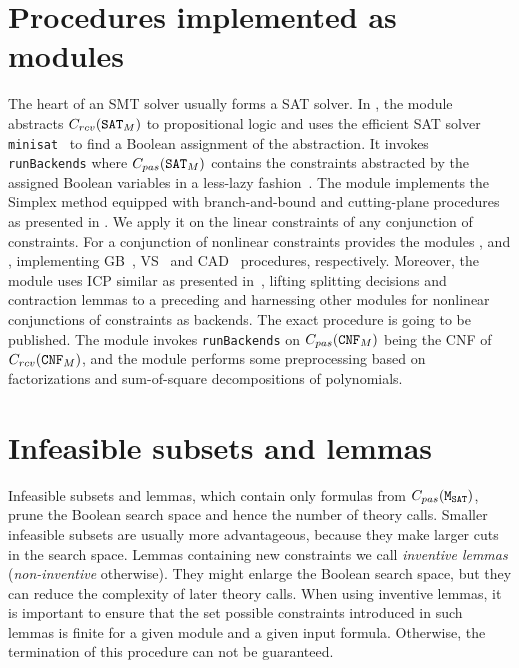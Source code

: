 \section{Procedures implemented as modules}
\label{sec:implemented_modules}
The heart of an SMT solver usually forms a SAT solver. In \smtrat, the module \satModule abstracts $C_{rcv}(\texttt{SAT$_M$})$ to propositional logic and uses the efficient SAT solver \texttt{minisat}~\cite{minisat} to find a Boolean assignment of the abstraction. It invokes \texttt{runBackends} where $C_{pas}(\texttt{SAT$_M$})$ contains the constraints abstracted by the assigned Boolean variables in a less-lazy fashion~\cite{sebastiani2007lazy}. The module \simplexModule implements the Simplex method equipped with branch-and-bound and cutting-plane procedures as presented in \cite{DM06}. We apply it on the linear constraints of any conjunction of \supportedLogics constraints. For a conjunction of nonlinear constraints \smtrat provides the modules \gbModule, \vsModule and \cadModule, implementing GB~\cite{JLCA_CAI13}, VS~\cite{Article_Corzilius_FCT2011} and CAD~\cite{Article_Loup_TubeCAD} procedures, respectively. Moreover, the module \icpModule uses ICP similar as presented in~\cite{GGIGSC10}, lifting splitting decisions and contraction lemmas to a preceding \satModule and harnessing other modules for nonlinear conjunctions of constraints as backends. The exact procedure is going to be published. The module \cnfModule invokes \texttt{runBackends} on $C_{pas}(\texttt{CNF$_M$})$ being the CNF of $C_{rcv}(\texttt{CNF$_M$})$, and the module \ppModule performs some preprocessing based on factorizations and sum-of-square decompositions of polynomials.

\section{Infeasible subsets and lemmas}
\label{sec::infsubset_lemmas}
Infeasible subsets and lemmas, which contain only formulas from 
$C_{pas}(\texttt{M$_\text{SAT}$})$, prune the Boolean search space and hence the number of theory calls. 
Smaller infeasible subsets are usually more advantageous, because they make larger cuts 
in the search space. Lemmas containing new constraints we call
\emph{inventive lemmas} (\emph{non-inventive} otherwise). They might enlarge the 
Boolean search space, but they can reduce the complexity of later theory calls.
When using inventive lemmas, it is important to ensure that the set possible
constraints introduced in such lemmas is finite for a given module and a given 
input formula. Otherwise, the termination of this procedure can not be guaranteed.

